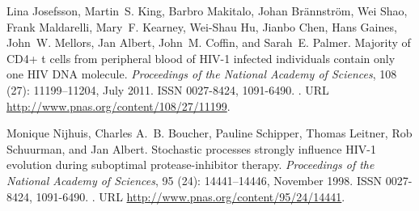\documentclass[11pt]{article}
\begin{document}
\begin{thebibliography}{48}
Lina Josefsson, Martin~S. King, Barbro Makitalo, Johan Br\"annstr\"om, Wei
  Shao, Frank Maldarelli, Mary~F. Kearney, Wei-Shau Hu, Jianbo Chen, Hans
  Gaines, John~W. Mellors, Jan Albert, John~M. Coffin, and Sarah~E. Palmer.
\newblock Majority of {CD4+} t cells from peripheral blood of {HIV-1} infected
  individuals contain only one {HIV} {DNA} molecule.
\newblock \emph{Proceedings of the National Academy of Sciences}, 108
  (27): 11199--11204, July 2011.
\newblock ISSN 0027-8424, 1091-6490.
\newblock {}.
\newblock URL \url{http://www.pnas.org/content/108/27/11199}.

Monique Nijhuis, Charles A.~B. Boucher, Pauline Schipper, Thomas Leitner, Rob
  Schuurman, and Jan Albert.
\newblock Stochastic processes strongly influence {HIV-1} evolution during
  suboptimal protease-inhibitor therapy.
\newblock \emph{Proceedings of the National Academy of Sciences}, 95
  (24): 14441--14446, November 1998.
\newblock ISSN 0027-8424, 1091-6490.
\newblock {}.
\newblock URL \url{http://www.pnas.org/content/95/24/14441}.

\end{thebibliography}
\end{document}
